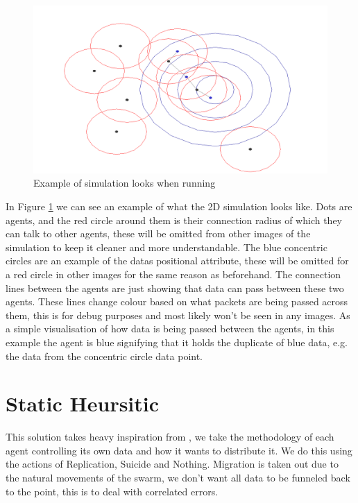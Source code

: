 \documentclass{UoYCSproject}
\begin{document}
\begin{figure}[htb]
\label{fig:Connarea}
\begin{center}
\centering
\includegraphics[width=\linewidth]{"./ExplanationImgs/Connarea.png"}
\caption{Example of simulation looks when running}
\end{center}
\end{figure}

In Figure \ref{fig:Connarea} we can see an example of what the 2D simulation looks like.
Dots are agents, and the red circle around them is their connection radius of which they can talk to other agents, these will be omitted from other images of the simulation to keep it cleaner and more understandable.
The blue concentric circles are an example of the datas positional attribute, these will be omitted for a red circle in other images for the same reason as beforehand.
The connection lines between the agents are just showing that data can pass between these two agents. These lines change colour based on what packets are being passed across them, this is for debug purposes and most likely won’t be seen in any images. 
As a simple visualisation of how data is being passed between the agents, in this example the agent is blue signifying that it holds the duplicate of blue data, e.g. the data from the  concentric circle data point.



\section{Static Heursitic}
\label{sec:Simple2}

This solution takes heavy inspiration from \cite{Distributed Storage}, we take the methodology of each agent controlling its own data and how it wants to distribute it. 
We do this using the actions of Replication, Suicide and Nothing. 
Migration is taken out due to the natural movements of the swarm, we don’t want all data to be funneled back to the point, this is to deal with correlated errors.
\end{document}
